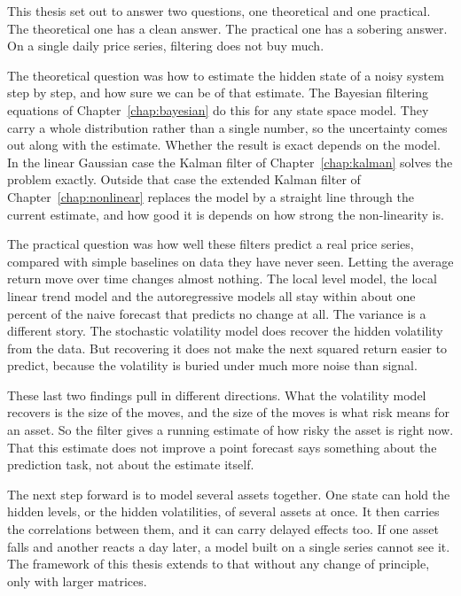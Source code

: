 This thesis set out to answer two questions, one theoretical and one practical. The theoretical one has a clean answer. The practical one has a sobering answer. On a single daily price series, filtering does not buy much.

The theoretical question was how to estimate the hidden state of a noisy system step by step, and how sure we can be of that estimate. The Bayesian filtering equations of Chapter~\ref{chap:bayesian} do this for any state space model. They carry a whole distribution rather than a single number, so the uncertainty comes out along with the estimate. Whether the result is exact depends on the model. In the linear Gaussian case the Kalman filter of Chapter~\ref{chap:kalman} solves the problem exactly. Outside that case the extended Kalman filter of Chapter~\ref{chap:nonlinear} replaces the model by a straight line through the current estimate, and how good it is depends on how strong the non-linearity is.

The practical question was how well these filters predict a real price series, compared with simple baselines on data they have never seen. Letting the average return move over time changes almost nothing. The local level model, the local linear trend model and the autoregressive models all stay within about one percent of the naive forecast that predicts no change at all. The variance is a different story. The stochastic volatility model does recover the hidden volatility from the data. But recovering it does not make the next squared return easier to predict, because the volatility is buried under much more noise than signal.

These last two findings pull in different directions. What the volatility model recovers is the size of the moves, and the size of the moves is what risk means for an asset. So the filter gives a running estimate of how risky the asset is right now. That this estimate does not improve a point forecast says something about the prediction task, not about the estimate itself.

The next step forward is to model several assets together. One state can hold the hidden levels, or the hidden volatilities, of several assets at once. It then carries the correlations between them, and it can carry delayed effects too. If one asset falls and another reacts a day later, a model built on a single series cannot see it. The framework of this thesis extends to that without any change of principle, only with larger matrices.
